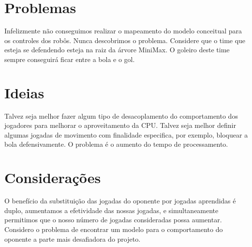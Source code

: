 \section{Problemas}
Infelizmente não conseguimos realizar o
mapeamento do modelo conceitual para os
controles dos robôs. Nunca descobrimos o
problema.
Considere que o time que esteja se defendendo
esteja na raiz da árvore MiniMax. O goleiro deste
time sempre conseguirá ficar entre a bola e o gol.

\section{Ideias}
Talvez seja melhor fazer algum tipo de
desacoplamento do comportamento dos
jogadores para melhorar o aproveitamento da
CPU\@.
Talvez seja melhor definir algumas jogadas de
movimento com finalidade especifica, por
exemplo, bloquear a bola defensivamente. O
problema é o aumento do tempo de
processamento.

\section{Considerações}
O benefício da substituição das jogadas do
oponente por jogadas aprendidas é duplo,
aumentamos a efetividade das nossas jogadas,
e simultaneamente permitimos que o nosso
número de jogadas consideradas possa
aumentar.
Considero o problema de encontrar um modelo
para o comportamento do oponente a parte
mais desafiadora do projeto.

